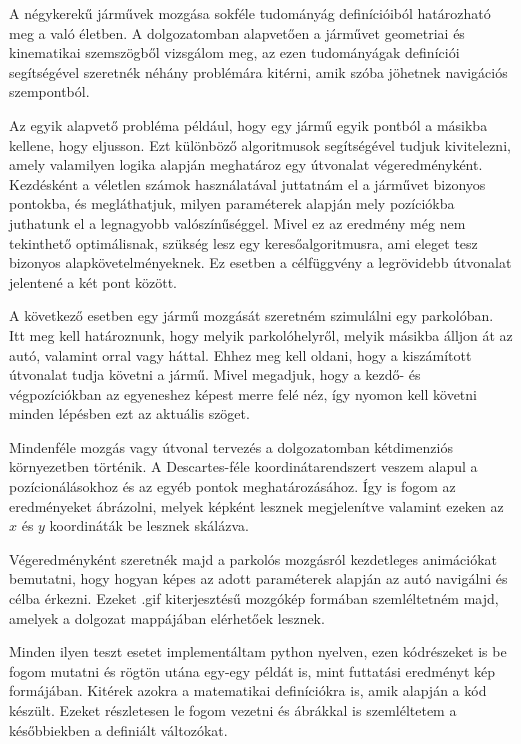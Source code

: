 
A négykerekű járművek mozgása sokféle tudományág definícióiból határozható meg a való életben. A dolgozatomban alapvetően a járművet geometriai és kinematikai szemszögből vizsgálom meg, az ezen tudományágak definíciói segítségével szeretnék néhány problémára kitérni, amik szóba jöhetnek navigációs szempontból.

Az egyik alapvető probléma például, hogy egy jármű egyik pontból a másikba kellene, hogy eljusson. Ezt különböző algoritmusok segítségével tudjuk kivitelezni, amely valamilyen logika alapján meghatároz egy útvonalat végeredményként. Kezdésként a véletlen számok használatával juttatnám el a járművet bizonyos pontokba, és megláthatjuk, milyen paraméterek alapján mely pozíciókba juthatunk el a legnagyobb valószínűséggel. Mivel ez az eredmény még nem tekinthető optimálisnak, szükség lesz egy keresőalgoritmusra, ami eleget tesz bizonyos alapkövetelményeknek. Ez esetben a célfüggvény a legrövidebb útvonalat jelentené a két pont között.

A következő esetben egy jármű mozgását szeretném szimulálni egy parkolóban. Itt meg kell határoznunk, hogy melyik parkolóhelyről, melyik másikba álljon át az autó, valamint orral vagy háttal. Ehhez meg kell oldani, hogy a kiszámított útvonalat tudja követni a jármű. Mivel megadjuk, hogy a kezdő- és végpozíciókban az egyeneshez képest merre felé néz, így nyomon kell követni minden lépésben ezt az aktuális szöget.

Mindenféle mozgás vagy útvonal tervezés a dolgozatomban kétdimenziós környezetben történik. A Descartes-féle koordinátarendszert veszem alapul a pozícionálásokhoz és az egyéb pontok meghatározásához. Így is fogom az eredményeket ábrázolni, melyek képként lesznek megjelenítve valamint ezeken az $ x $ és $ y $ koordináták be lesznek skálázva.

Végeredményként szeretnék majd a parkolós mozgásról kezdetleges animációkat bemutatni, hogy hogyan képes az adott paraméterek alapján az autó navigálni és célba érkezni. Ezeket .gif kiterjesztésű mozgókép formában szemléltetném majd, amelyek a dolgozat mappájában elérhetőek lesznek.

Minden ilyen teszt esetet implementáltam python nyelven, ezen kódrészeket is be fogom mutatni és rögtön utána egy-egy példát is, mint futtatási eredményt kép formájában. Kitérek azokra a matematikai definíciókra is, amik alapján a kód készült. Ezeket részletesen le fogom vezetni és ábrákkal is szemléltetem a későbbiekben a definiált változókat.



